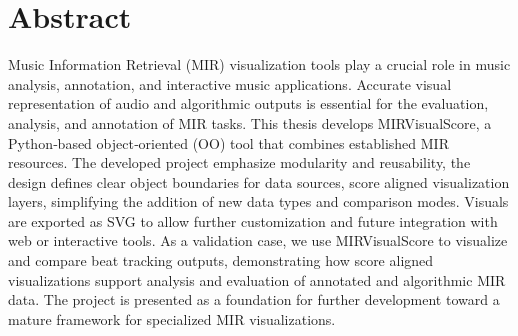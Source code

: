 \chapter*{Abstract}

Music Information Retrieval (MIR) visualization tools play a crucial role in music analysis, annotation, and interactive music applications. Accurate visual representation of audio and algorithmic outputs is essential for the evaluation, analysis, and annotation of MIR tasks. This thesis develops MIRVisualScore, a Python‑based object‑oriented (OO) tool that combines established MIR resources. The developed project emphasize modularity and reusability, the design defines clear object boundaries for data sources, score aligned visualization layers, simplifying the addition of new data types and comparison modes. Visuals are exported as SVG to allow further customization and future integration with web or interactive tools. As a validation case, we use MIRVisualScore to visualize and compare beat tracking outputs, demonstrating how score aligned visualizations support analysis and evaluation of annotated and algorithmic MIR data. The project is presented as a foundation for further development toward a mature framework for specialized MIR visualizations.